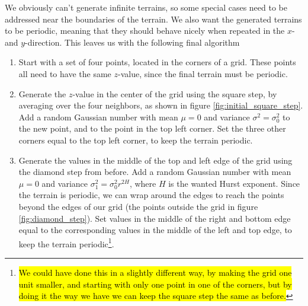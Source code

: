 We obviously can't generate infinite terrains, so some special cases need to be addressed near the boundaries of the terrain. We also want the generated terrains to be periodic, meaning that they should behave nicely when repeated in the $x$- and $y$-direction. This leaves us with the following final algorithm
\begin{enumerate}
    \item Start with a set of four points, located in the corners of a grid. These points all need to have the same $z$-value, since the final terrain must be periodic.
    \item Generate the $z$-value in the center of the grid using the square step, by averaging over the four neighbors, as shown in figure \ref{fig:initial_square_step}. Add a random Gaussian number with mean $\mu = 0$ and variance $\sigma^2 = \sigma_0^2$ to the new point, and to the point in the top left corner. Set the three other corners equal to the top left corner, to keep the terrain periodic.
    \item Generate the values in the middle of the top and left edge of the grid using the diamond step from before. Add a random Gaussian number with mean $\mu = 0$ and variance $\sigma_1^2 = \sigma_0^2r^{2H}$, where $H$ is the wanted Hurst exponent. Since the terrain is periodic, we can wrap around the edges to reach the points beyond the edges of our grid (the points outside the grid in figure \ref{fig:diamond_step}). Set values in the middle of the right and bottom edge equal to the corresponding values in the middle of the left and top edge, to keep the terrain periodic\footnote{\hl{We could have done this in a slightly different way, by making the grid one unit smaller, and starting with only one point in one of the corners, but by doing it the way we have we can keep the square step the same as before.}}.
    
    

\end{enumerate}
